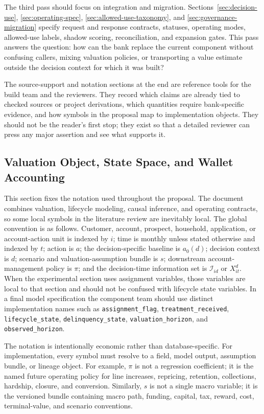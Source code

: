 \documentclass[11pt]{article}
\newcommand{\1}{\mathbf{1}}
\newcommand{\code}[1]{\nolinkurl{#1}}
\begin{document}
The third pass should focus on integration and migration.
Sections~\ref{sec:decision-use}, \ref{sec:operating-spec},
\ref{sec:allowed-use-taxonomy}, and \ref{sec:governance-migration} specify
request and response contracts, statuses, operating modes, allowed-use labels,
shadow scoring, reconciliation, and expansion gates. This pass answers the
question: how can the bank replace the current component without confusing
callers, mixing valuation policies, or transporting a value estimate outside
the decision context for which it was built?

The source-support and notation sections at the end are reference tools for
the build team and the reviewers. They record which claims are already tied to
checked sources or project derivations, which quantities require bank-specific
evidence, and how symbols in the proposal map to implementation objects. They
should not be the reader's first stop; they exist so that a detailed reviewer
can press any major assertion and see what supports it.

\subsection{Valuation Object, State Space, and Wallet Accounting}
\label{sec:valuation-spine}

This section fixes the notation used throughout the proposal. The document
combines valuation, lifecycle modeling, causal inference, and operating
contracts, so some local symbols in the literature review are inevitably
local. The global convention is as follows. Customer, account, prospect,
household, application, or account-action unit is indexed by $i$; time is
monthly unless stated otherwise and indexed by $t$; action is $a$; the
decision-specific baseline is $a_0(d)$; decision context is $d$; scenario and
valuation-assumption bundle is $s$; downstream account-management policy is
$\pi$; and the decision-time information set is $\mathcal{I}_{id}$ or
$X_{it}^{d}$. When the experimental section uses assignment variables, those
variables are local to that section and should not be confused with lifecycle
state variables. In a final model specification the component team should use
distinct implementation names such as \code{assignment_flag},
\code{treatment_received}, \code{lifecycle_state}, \code{delinquency_state},
\code{valuation_horizon}, and \code{observed_horizon}.

The notation is intentionally economic rather than database-specific. For
implementation, every symbol must resolve to a field, model output, assumption
bundle, or lineage object. For example, $\pi$ is not a regression coefficient;
it is the named future operating policy for line increases, repricing,
retention, collections, hardship, closure, and conversion. Similarly, $s$ is
not a single macro variable; it is the versioned bundle containing macro path,
funding, capital, tax, reward, cost, terminal-value, and scenario conventions.
\end{document}
